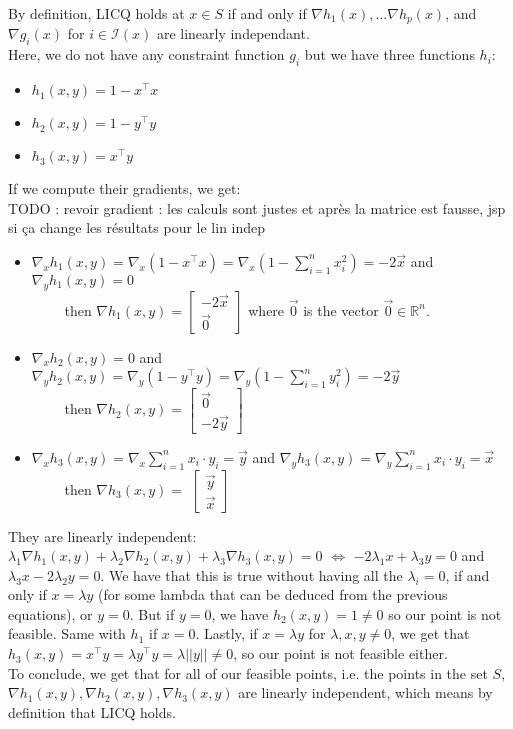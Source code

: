 \documentclass{article}
\newcommand{\R}{\mathbb{R}}
\begin{document}
By definition, LICQ holds at $x\in S$ if and only if $\nabla h_1(x),\dots\nabla h_p(x)$, and $\nabla g_i(x)$ for $i\in \mathcal I(x) $ are linearly independant.\\
Here, we do not have any constraint function $g_i$ but we have three functions $h_i$:
\begin{itemize}
\item  $h_1(x,y)=1-x^\top x$
\item $h_2(x,y)=1-y^\top y$
\item $h_3(x,y)= x^\top y$
\end{itemize} 
If we compute their gradients, we get:\\
TODO : revoir gradient : les calculs sont justes et après la matrice est fausse, jsp si ça change les résultats pour le lin indep
\begin{itemize}
\item  $\nabla_x h_1(x,y)=\nabla_x \left(1-x^\top x\right)= \nabla_x \left(1-\sum_{i=1}^n x_{i}^2 \right)=-2\vec x$  and $\nabla_y h_1(x,y)=0$ \\

$\qquad$ then $\nabla h_1(x,y)=
\begin{bmatrix}
-2 \vec{x}\\
\vec{0}
\end{bmatrix}
$ where $\vec{0}$ is the vector $\vec{0} \in \R^n$.
\item  $\nabla_x h_2(x,y)=0$ and $\nabla_y h_2(x,y)=\nabla_y \left(1-y^\top y\right)= \nabla_y \left(1-\sum_{i=1}^n y_{i}^2 \right)=-2\vec y$ \\

$\qquad$ then $\nabla h_2(x,y)=
\begin{bmatrix}
\vec{0}\\
-2 \vec{y}
\end{bmatrix}
$
\item $\nabla_x h_3(x,y)= \nabla_x \sum_{i=1}^n x_i \cdot y_i= \vec{y}$ and  $\nabla_y h_3(x,y)= \nabla_y \sum_{i=1}^n x_i \cdot y_i= \vec{x}$\\

$\qquad$ then $\nabla h_3(x,y)=$
$
\begin{bmatrix}
\vec{y}\\
\vec{x}
\end{bmatrix}
$
\end{itemize} 

\noindent They are linearly independent:\\
$\lambda_1 \nabla h_1(x,y)+\lambda_2\nabla h_2(x,y)+\lambda_3 \nabla h_3(x,y)=0 $ $\iff$ $- 2 \lambda_1 x + \lambda_3 y=0$ and  $\lambda_3 x -2 \lambda_2 y=0$. We have that this is true without having all the $\lambda_i=0$, if and only if $x=\lambda y$ (for some lambda that can be deduced from the previous equations), or $y=0$. But if $y=0$, we have $h_2(x,y)=1\neq 0$ so our point is not feasible. Same with $h_1$ if $x=0$. Lastly, if $x=\lambda y$ for $\lambda, x, y \neq 0$, we get that $h_3(x,y)=x^\top y=\lambda y^\top y=\lambda ||y|| \neq 0$, so our point is not feasible either.\\
To conclude, we get that for all of our feasible points, i.e. the points in the set $S$, $ \nabla h_1(x,y), \nabla h_2(x,y), \nabla h_3(x,y)$ are linearly independent, which means by definition that LICQ holds.
\end{document}
